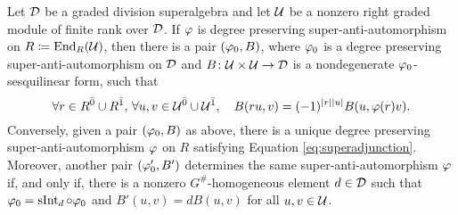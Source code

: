 





\begin{thm}\label{thm:vphi-iff-vphi0-and-B}
    Let $\mathcal{D}$ be a graded division superalgebra and let $\mathcal U$ be a nonzero right graded module of finite rank over $\mathcal{D}$. 
    If $\varphi$ is degree preserving super-anti-automorphism on $R \coloneqq \operatorname{End}_R(\mathcal U)$, then there is a pair $(\varphi_0, B)$, where $\varphi_0$ is a degree preserving super-anti-automorphism on $\mathcal{D}$ and $B\colon \mathcal U \times \mathcal U \to \mathcal{D}$ is a nondegenerate $\varphi_0$-sesquilinear form, such that
    \begin{equation}\label{eq:superadjunction}
        \forall r\in R^{\bar0} \cup R^{\bar1},\,\forall u, v \in \mathcal U^{\bar0} \cup \mathcal U^{\bar1},  \quad B(ru,v) = (-1)^{|r||u|} B(u,\varphi(r)v).
    \end{equation}
    Conversely, given a pair $(\varphi_0, B)$ as above, there is a unique degree preserving super-anti-automorphism $\varphi$ on $R$ satisfying Equation \eqref{eq:superadjunction}. 
    Moreover, another pair $(\varphi_0', B')$ determines the same super-anti-automorphism $\varphi$ if, and only if, there is a nonzero $G^\#$-homogeneous element $d\in \mathcal{D}$ such that $\varphi_0 = \operatorname{sInt}_d \circ \varphi_0$ and $B'(u, v) = dB (u, v)$ for all $u, v \in \mathcal U$.
\end{thm}

